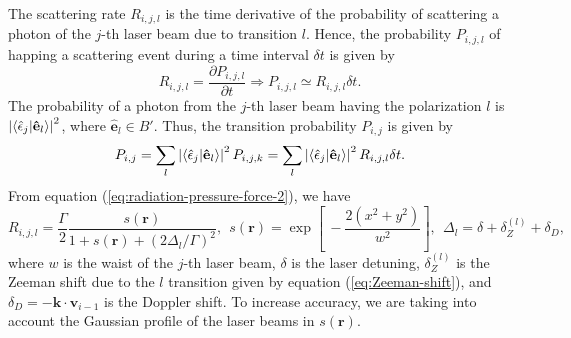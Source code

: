 The scattering rate $ R_{i,j,l} $ is the time derivative of the probability of scattering a photon of the $j$-th laser beam due to transition $ l $. Hence, the probability $ P_{i,j,l} $ of happing a scattering event during a time interval $ \delta t $ is given by
\begin{equation}
    R_{i,j,l} = \frac{\partial P_{i,j,l}}{\partial t} \Rightarrow P_{i,j,l} \simeq R_{i,j,l} \delta t.
\end{equation}
The probability of a photon from the $j$-th laser beam having the polarization $ l $ is $ \left| \braket{\hat{\epsilon}_j|\mathbf{\hat{e}}_l} \right|^2 $, where $ \mathbf{\hat{e}}_l \in B' $. Thus, the transition probability $ P_{i,j} $ is given by
\begin{equation}
    P_{i,j} = \sum_{l} \left| \braket{\hat{\epsilon}_j|\mathbf{\hat{e}}_l} \right|^2 P_{i,j,k} =  \sum_{l} \left| \braket{\hat{\epsilon}_j|\mathbf{\hat{e}}_l} \right|^2 R_{i,j,l} \delta t.
\end{equation}
From equation (\ref{eq:radiation-pressure-force-2}), we have
\begin{equation}
    R_{i,j,l} = \frac{\Gamma}{2}\frac{s(\mathbf{r})}{1 + s(\mathbf{r}) + (2\Delta_l / \Gamma)^2},\ \ s(\mathbf{r}) = \exp\left[\ -\frac{2(x^2 + y^2)}{w^2} \right],\ \ \Delta_l = \delta + \delta_Z^{(l)} + \delta_D,
    \label{eq:scattering-rate-each-transition}
\end{equation}
where $ w $ is the waist of the $ j $-th laser beam, $ \delta $ is the laser detuning, $ \delta_Z^{(l)} $ is the Zeeman shift due to the $ l $ transition given by equation (\ref{eq:Zeeman-shift}), and $ \delta_D = - \mathbf{k} \cdot \mathbf{v}_{i - 1} $ is the Doppler shift. To increase accuracy, we are taking into account the Gaussian profile of the laser beams in $ s(\mathbf{r}) $.
